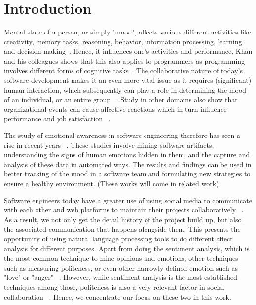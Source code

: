 \section{Introduction}

Mental state of a person, or simply "mood", affects various different activities like creativity, memory tasks, reasoning, behavior, information processing, learning and decision making~\cite{khan2011moods}. Hence, it influences one's
activities and performance. Khan and his colleagues shows that this also applies to programmers as programming involves different forms of cognitive tasks~\cite{khan2011moods}. The collaborative nature of today's software development makes it an even more vital issue as it requires (significant) human interaction, which subsequently can play a role in determining the mood of an individual, or an entire group  ~\cite{murgia2014developers,graziotin2014happy,curtis1988field}. Study in other domains also show that organizational events can cause affective reactions which in turn influence performance and job satisfaction ~\cite{parkinson1996changing}.

The study of emotional awareness in software engineering therefore has seen a rise in recent years ~\cite{jongeling2017negative}. These studies involve mining software artifacts, understanding the signs of human emotions hidden in them, and the capture and analysis of these data in automated ways. The results and findings can be used in better tracking of the mood in a software team and formulating new strategies to ensure a healthy environment. (These works will come in related work)

Software engineers today have a greater use of using social media to communicate with each other and web platforms to maintain their projects collaboratively ~\cite{storey2010impact}. As a result, we not only get the detail history of the project build up, but also the associated communication that happens alongside them. This presents the opportunity of using natural language processing tools to do different affect analysis
for different purposes. Apart from doing the sentiment analysis, which is the most common technique to mine opinions and emotions, other techniques such as measuring politeness, or even other narrowly defined emotion such as "love" or "anger" ~\cite{ortu2015bullies}. However, while sentiment analysis is the most established techniques among those, politeness is also a very relevant factor in social collaboration ~\cite{steinmacher2015social}. Hence, we concentrate our focus on these two in this work.

